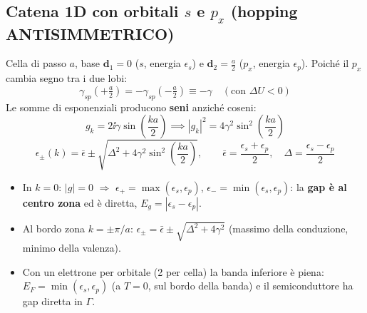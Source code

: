 \subsection{Catena 1D con orbitali $s$ e $p_x$ (hopping ANTISIMMETRICO)}
\label{sec:sp}
Cella di passo $a$, base $\mathbf{d}_1=0$ ($s$, energia $\epsilon_s$) e $\mathbf{d}_2=\frac a2$ ($p_x$, energia $\epsilon_p$). Poiché il $p_x$ cambia segno tra i due lobi:
\[ \gamma_{sp}(+\tfrac a2) = -\gamma_{sp}(-\tfrac a2) \equiv -\gamma \quad(\text{con }\Delta U<0) \]
Le somme di esponenziali producono \textbf{seni} anziché coseni:
\[ g_k = 2\ii\gamma\sin\!\left(\frac{ka}{2}\right) \implies |g_k|^2 = 4\gamma^2\sin^2\!\left(\frac{ka}{2}\right) \]
\[ \boxed{\epsilon_\pm(k) = \bar\epsilon \pm \sqrt{\Delta^2 + 4\gamma^2\sin^2\!\left(\frac{ka}{2}\right)}},
   \qquad \bar\epsilon = \frac{\epsilon_s+\epsilon_p}{2},\quad \Delta = \frac{\epsilon_s-\epsilon_p}{2} \]
\begin{itemize}
  \item In $k=0$: $|g|=0$ $\Rightarrow$ $\epsilon_+ = \max(\epsilon_s,\epsilon_p)$, $\epsilon_- = \min(\epsilon_s,\epsilon_p)$: la \textbf{gap è al centro zona} ed è diretta, $E_g = |\epsilon_s-\epsilon_p|$.
  \item Al bordo zona $k=\pm\pi/a$: $\epsilon_\pm = \bar\epsilon\pm\sqrt{\Delta^2+4\gamma^2}$ (massimo della conduzione, minimo della valenza).
  \item Con un elettrone per orbitale (2 per cella) la banda inferiore è piena: $E_F = \min(\epsilon_s,\epsilon_p)$ (a $T=0$, sul bordo della banda) e il semiconduttore ha gap diretta in $\Gamma$.
\end{itemize}

